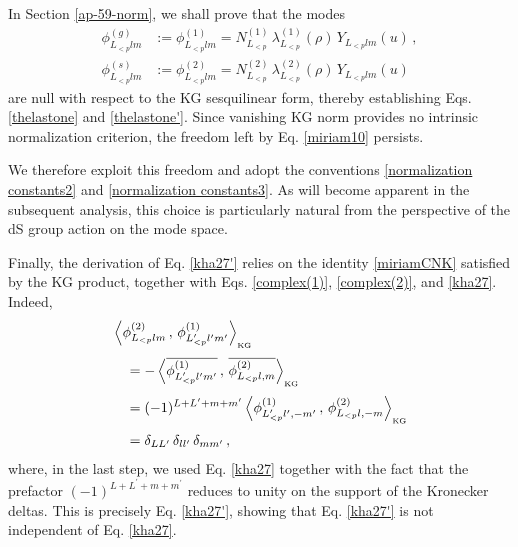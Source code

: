 \documentclass[aps,twocolumn,nofootinbib]{revtex4}
\begin{document}
{\begin{appendix}
In Section \ref{ap-59-norm}, we shall prove that the modes
\begin{align}
    \phi^{(g)}_{L_{<p}^{}lm} &:= \phi^{(1)}_{L_{<p}^{}lm} = N^{(1)}_{L^{}_{< p}}\, \lambda^{(1)}_{L^{}_{< p}}(\rho)\, Y^{}_{L^{}_{< p}lm}(u) \,, \nonumber\\[3pt] \phi^{(s)}_{L_{<p}^{}lm} &:= \phi^{(2)}_{L_{<p}^{}lm} = N^{(2)}_{L^{}_{< p}}\, \lambda^{(2)}_{L^{}_{< p}}(\rho)\, Y^{}_{L^{}_{< p}lm}(u)
\end{align}
are null with respect to the KG sesquilinear form, thereby establishing Eqs. \eqref{thelastone} and  \eqref{thelastone'}. Since vanishing KG norm provides no intrinsic normalization criterion, the freedom left by Eq. \eqref{miriam10} persists.

We therefore exploit this freedom and adopt the conventions \eqref{normalization constants2} and \eqref{normalization constants3}. As will become apparent in the subsequent analysis, this choice is particularly natural from the perspective of the dS group action on the mode space.

Finally, the derivation of Eq. \eqref{kha27'} relies on the identity \eqref{miriamCNK} satisfied by the KG product, together with Eqs. \eqref{complex(1)}, \eqref{complex(2)}, and \eqref{kha27}. Indeed,
\begin{align}
    &\left\langle \phi^{(2)}_{L_{<p}lm} \,,\, \phi^{(1)}_{L^\prime_{<p}l^\prime m^\prime}\right\rangle_{\vphantom{}_{\text{KG}}} \nonumber\\[3pt]
    &\quad = -\left\langle \overline{\phi^{(1)}_{L^\prime_{<p}l^\prime m^\prime}} \,,\, \overline{\phi^{(2)}_{L_{<p}l,m}} \right\rangle_{\vphantom{}_{\text{KG}}} \nonumber\\[3pt]
    &\quad = (-1)^{L+L^\prime+m+m^\prime}\left\langle \phi^{(1)}_{L_{<p}^\prime l^\prime,-m^\prime} \,,\, \phi^{(2)}_{L_{<p}l, -m}\right\rangle_{\vphantom{}_{\text{KG}}} \nonumber\\[3pt]
    &\quad = \delta_{LL^\prime}\, \delta_{ll^\prime}\, \delta_{mm^\prime} \,,
\end{align}
where, in the last step, we used Eq. \eqref{kha27} together with the fact that the prefactor $(-1)^{L+L^\prime+m+m^\prime}$ reduces to unity on the support of the Kronecker deltas. This is precisely Eq. \eqref{kha27'}, showing that Eq. \eqref{kha27'} is not independent of Eq. \eqref{kha27}.



\end{appendix}}
\end{document}
